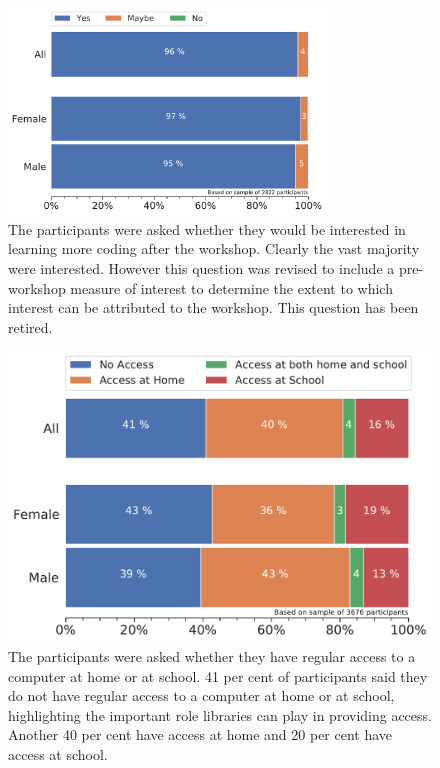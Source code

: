 \documentclass[12pt]{report} %
\begin{document}
\begin{figure}[t!]
    \centering
        \includegraphics[width=0.75\textwidth]{bar_Want_to_LearnMoreCoding}
\caption{The participants were asked whether they would be interested in learning more coding after the workshop. Clearly the vast majority were interested. However this question was revised to include a pre-workshop measure of interest to determine the extent to which interest can be attributed to the workshop. This question has been retired.} 
\label{fig:learnmore}
\end{figure}

\begin{figure}[t!]
    \centering
        \includegraphics[width=1\textwidth]{bar_ITaccess}
\caption{The participants were asked whether they have regular access to a computer at home or at school. 41 per cent of participants said they do not have regular access to a computer at home or at school, highlighting the important role libraries can play in providing access. Another 40 per cent have access at home and 20 per cent have access at school. } 
\label{fig:itaccess}
\end{figure}
\end{document}
